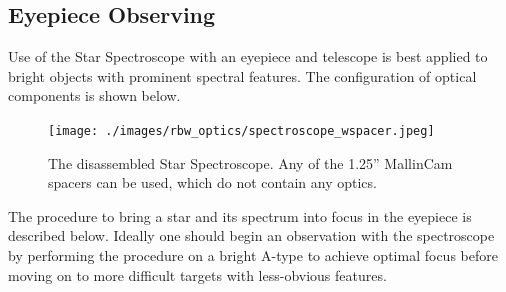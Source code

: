 \documentclass[12pt,titlepage]{article}
\begin{document}
\subsection{Eyepiece Observing}
Use of the Star Spectroscope with an eyepiece and telescope is best applied to bright objects with prominent spectral features.
The configuration of optical components is shown below.
\begin{figure}[H] 
	\begin{center}
		\texttt{[image: ./images/rbw\_optics/spectroscope\_wspacer.jpeg]} 
		\caption{The disassembled Star Spectroscope.
				Any of the 1.25'' MallinCam spacers can be used, which do not contain any optics.}
		\label{mfr5}
	\end{center}
\end{figure}
The procedure to bring a star and its spectrum into focus in the eyepiece is described below.
Ideally one should begin an observation with the spectroscope by performing the procedure on a bright A-type
to achieve optimal focus before moving on to more difficult targets with less-obvious features.
\end{document}
